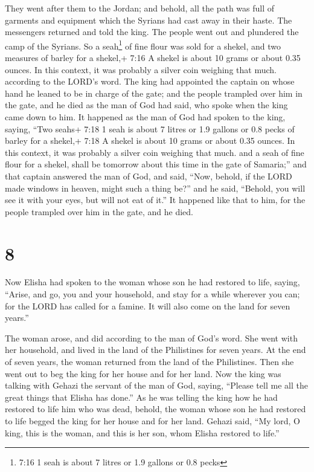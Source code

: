  They went after them to the Jordan; and behold, all the
path was full of garments and equipment which the Syrians had cast away
in their haste. The messengers returned and told the king. 
The people went out and plundered the camp of the Syrians. So a
seah\footnote{7:16 1 seah is about 7 litres or 1.9 gallons or 0.8 pecks}
of fine flour was sold for a shekel, and two measures of barley for a
shekel,+ 7:16 A shekel is about 10 grams or about 0.35 ounces. In this
context, it was probably a silver coin weighing that much. according to
the LORD's word.  The king had appointed the captain on
whose hand he leaned to be in charge of the gate; and the people
trampled over him in the gate, and he died as the man of God had said,
who spoke when the king came down to him.  It happened as
the man of God had spoken to the king, saying, ``Two seahs+ 7:18 1 seah
is about 7 litres or 1.9 gallons or 0.8 pecks of barley for a shekel,+
7:18 A shekel is about 10 grams or about 0.35 ounces. In this context,
it was probably a silver coin weighing that much. and a seah of fine
flour for a shekel, shall be tomorrow about this time in the gate of
Samaria;''  and that captain answered the man of God, and
said, ``Now, behold, if the LORD made windows in heaven, might such a
thing be?'' and he said, ``Behold, you will see it with your eyes, but
will not eat of it.''  It happened like that to him, for
the people trampled over him in the gate, and he died.

\hypertarget{section-7}{%
\section{8}\label{section-7}}

 Now Elisha had spoken to the woman whose son he had
restored to life, saying, ``Arise, and go, you and your household, and
stay for a while wherever you can; for the LORD has called for a famine.
It will also come on the land for seven years.''

 The woman arose, and did according to the man of God's
word. She went with her household, and lived in the land of the
Philistines for seven years.  At the end of seven years, the
woman returned from the land of the Philistines. Then she went out to
beg the king for her house and for her land.  Now the king
was talking with Gehazi the servant of the man of God, saying, ``Please
tell me all the great things that Elisha has done.''  As he
was telling the king how he had restored to life him who was dead,
behold, the woman whose son he had restored to life begged the king for
her house and for her land. Gehazi said, ``My lord, O king, this is the
woman, and this is her son, whom Elisha restored to life.''

